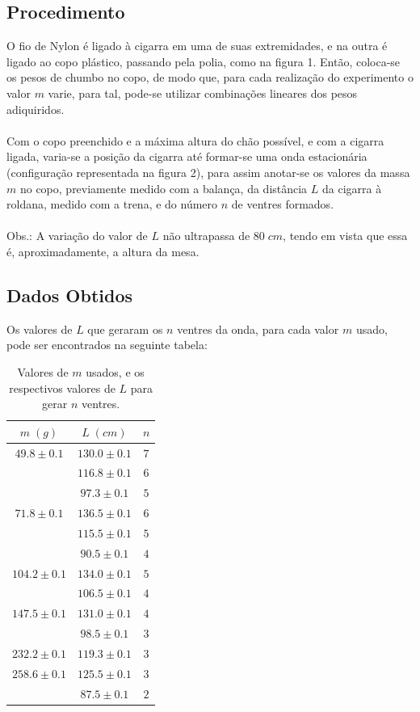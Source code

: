 \documentclass[12pt,a4paper]{article}
\begin{document}
\subsection{Procedimento}
O fio de Nylon é ligado à cigarra em uma de suas extremidades, e na outra é ligado ao copo plástico, passando pela polia, como na figura 1. Então, coloca-se os pesos de chumbo no copo, de modo que, para cada realização do experimento o valor $m$ varie, para tal, pode-se utilizar combinações lineares dos pesos adiquiridos. \\\\
Com o copo preenchido e a máxima altura do chão possível, e com a cigarra ligada, varia-se a posição da cigarra até formar-se uma onda estacionária (configuração representada na figura 2), para assim anotar-se os valores da massa $m$ no copo, previamente medido com a balança, da distância $L$ da cigarra à roldana, medido com a trena, e do número $n$ de ventres formados. \\\\
Obs.: A variação do valor de $L$ não ultrapassa de $80 \; cm$, tendo em vista que essa é, aproximadamente, a altura da mesa.


\subsection{Dados Obtidos}
Os valores de $L$ que geraram os $n$ ventres da onda, para cada valor $m$ usado, pode ser encontrados na seguinte tabela:\\

\begin{table}[!htbp]
\centering
\def\arraystretch{1.3}
\caption{Valores de $m$ usados, e os respectivos valores de $L$ para gerar $n$ ventres.}
\label{Resultados}
\begin{tabular}{|c|c|c|}
\hline
$m \; (g)$ & $L \; (cm)$ & $n$\\
\hline
$49.8 \pm 0.1$ & $130.0 \pm 0.1$ & $7$\\
$            $ & $116.8 \pm 0.1$ & $6$\\
$            $ & $ 97.3 \pm 0.1$ & $5$\\
\hline
$71.8 \pm 0.1$ & $136.5 \pm 0.1$ & $6$\\
$            $ & $115.5 \pm 0.1$ & $5$\\
$            $ & $ 90.5 \pm 0.1$ & $4$\\
\hline
$104.2 \pm 0.1$ & $134.0 \pm 0.1$ & $5$\\
$             $ & $106.5 \pm 0.1$ & $4$\\
\hline
$147.5 \pm 0.1$ & $131.0 \pm 0.1$ & $4$\\
$             $ & $ 98.5 \pm 0.1$ & $3$\\
\hline
$232.2 \pm 0.1$ & $119.3 \pm 0.1$ & $3$\\
\hline
$258.6 \pm 0.1$ & $125.5 \pm 0.1$ & $3$\\
$             $ & $ 87.5 \pm 0.1$ & $2$\\
\hline

\end{tabular} \\

\end{table}
\end{document}
